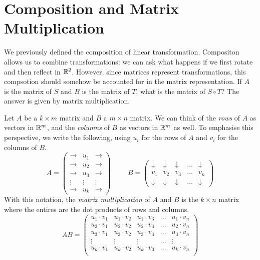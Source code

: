 \documentclass[fleqn]{report}
\begin{document}
\section{Composition and Matrix Multiplication}

We previously defined the composition of linear
transformation. Compositon allows us to combine
transformations: we can ask what happens if we first rotate
and then reflect in $\mathbb{R}^2$. However, since matrices
represent transformations, this compsotion should somehow be
accounted for in the matrix representation. If $A$ is the
matrix of $S$ and $B$ is the matrix of $T$, what is the matrix
of $S \circ T$? The answer is given by matrix multiplication.

\begin{defn}
Let $A$ be a $k \times m$ matrix and $B$ a $m \times n$
matrix. We can think of the \emph{rows} of $A$ as vectors in
$\mathbb{R}^m$, and the \emph{columns} of $B$ as vectors in $\mathbb{R}^m$
as well. To emphasise this perspective, we write the following,
using $u_i$ for the rows of $A$ and $v_i$ for the columns of
$B$.
\begin{equation*}
A = \left( \begin{matrix}
\rightarrow & u_1 & \rightarrow \\
\rightarrow & u_2 & \rightarrow \\
\rightarrow & u_3 & \rightarrow \\
\vdots & \vdots & \vdots \\
\rightarrow & u_k & \rightarrow 
\end{matrix} \right) 
\hspace{1cm}
B = \left( \begin{matrix}
\downarrow & \downarrow & \downarrow & \ldots & \downarrow \\
v_1 & v_2 & v_3 & \ldots & v_n \\
\downarrow & \downarrow & \downarrow & \ldots & \downarrow 
\end{matrix} \right) 
\end{equation*}
With this notation, the \emph{matrix multiplication} of
$A$ and $B$ is the $k \times n$ matrix where the entires are
the dot products of rows and columns.
\begin{equation*}
AB = \left( \begin{matrix} 
u_1 \cdot v_1 &
u_1 \cdot v_2 &
u_1 \cdot v_3 &
\ldots &
u_1 \cdot v_n \\
u_2 \cdot v_1 &
u_2 \cdot v_2 &
u_2 \cdot v_3 &
\ldots &
u_2 \cdot v_n \\
u_3 \cdot v_1 &
u_3 \cdot v_2 &
u_3 \cdot v_3 &
\ldots &
u_3 \cdot v_n \\
\vdots & \vdots & \vdots & \ldots & \vdots \\
u_k \cdot v_1 &
u_k \cdot v_2 &
u_k \cdot v_3 &
\ldots &
u_k \cdot v_n \\
\end{matrix} \right) 
\end{equation*}
\end{defn}
\end{document}
